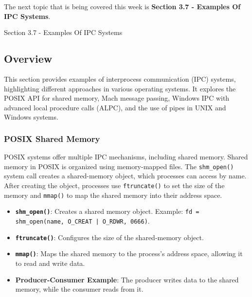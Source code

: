 The next topic that is being covered this week is \textbf{Section 3.7 - Examples Of IPC Systems}.

\begin{notes}{Section 3.7 - Examples Of IPC Systems}
    \subsection*{Overview}

    This section provides examples of interprocess communication (IPC) systems, highlighting different approaches in various operating systems. It explores the POSIX API for shared memory, Mach message 
    passing, Windows IPC with advanced local procedure calls (ALPC), and the use of pipes in UNIX and Windows systems.
    
    \subsubsection*{POSIX Shared Memory}
    
    POSIX systems offer multiple IPC mechanisms, including shared memory. Shared memory in POSIX is organized using memory-mapped files. The \texttt{shm\_open()} system call creates a shared-memory 
    object, which processes can access by name. After creating the object, processes use \texttt{ftruncate()} to set the size of the memory and \texttt{mmap()} to map the shared memory into their address space.
    
    \begin{highlight}
    
        \begin{itemize}
            \item \textbf{\texttt{shm\_open()}}: Creates a shared memory object. Example: \texttt{fd = shm\_open(name, O\_CREAT | O\_RDWR, 0666)}.
            \item \textbf{\texttt{ftruncate()}}: Configures the size of the shared-memory object.
            \item \textbf{\texttt{mmap()}}: Maps the shared memory to the process's address space, allowing it to read and write data.
            \item \textbf{Producer-Consumer Example}: The producer writes data to the shared memory, while the consumer reads from it.
        \end{itemize}
    
    \end{highlight}
    

\end{notes}
